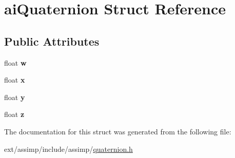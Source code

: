 \hypertarget{structai_quaternion}{\section{ai\-Quaternion Struct Reference}
\label{structai_quaternion}
}
\subsection*{Public Attributes}
\begin{DoxyCompactItemize}
\item 
\hypertarget{structai_quaternion_a410b3c46417d67d728a01a5810907a36}{float {\bfseries w}}\label{structai_quaternion_a410b3c46417d67d728a01a5810907a36}

\item 
\hypertarget{structai_quaternion_af9db21b086c14d8654d62005f740e75f}{float {\bfseries x}}\label{structai_quaternion_af9db21b086c14d8654d62005f740e75f}

\item 
\hypertarget{structai_quaternion_a1695fefbc60becf95fcafcc08573ab44}{float {\bfseries y}}\label{structai_quaternion_a1695fefbc60becf95fcafcc08573ab44}

\item 
\hypertarget{structai_quaternion_acc30da6103d5131fb1bed6640f1eeda0}{float {\bfseries z}}\label{structai_quaternion_acc30da6103d5131fb1bed6640f1eeda0}

\end{DoxyCompactItemize}


The documentation for this struct was generated from the following file\-:\begin{DoxyCompactItemize}
\item 
ext/assimp/include/assimp/\hyperlink{quaternion_8h}{quaternion.\-h}\end{DoxyCompactItemize}
